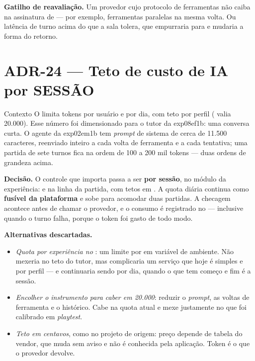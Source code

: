 \textbf{Gatilho de reavaliação.} Um provedor cujo protocolo de ferramentas não
caiba na assinatura de  --- por exemplo, ferramentas paralelas na
mesma volta. Ou latência de turno acima do que a sala tolera, que empurraria para
 e mudaria a forma do retorno.

\section{ADR-24 --- Teto de custo de IA por SESSÃO}
\label{adr:teto-sessao}

\begin{especificacao}{Contexto}
O  limita tokens por usuário e por dia, com teto por perfil
( valia 20.000). Esse número foi
dimensionado para o tutor da exp08ef1b: uma conversa curta. O agente da exp02em1b tem
\emph{prompt} de sistema de cerca de 11.500 caracteres, reenviado inteiro a cada
volta de ferramenta e a cada tentativa; uma partida de sete turnos fica na ordem
de 100 a 200 mil tokens --- duas ordens de grandeza acima.
\end{especificacao}

\textbf{Decisão.} O controle que importa passa a ser \textbf{por sessão}, no
módulo da experiência:  e  na linha da
partida, com tetos em . A quota diária continua como
\textbf{fusível da plataforma} e sobe para acomodar duas partidas. A checagem
acontece antes de chamar o provedor, e o consumo é registrado no  ---
inclusive quando o turno falha, porque o token foi gasto de todo modo.

\textbf{Alternativas descartadas.}
\begin{itemize}
  \item \emph{Quota por experiência no }: um limite por
     em variável de ambiente. Não mexeria no teto do tutor, mas
    complicaria um serviço que hoje é simples e por perfil --- e continuaria
    sendo por dia, quando o que tem começo e fim é a sessão.
  \item \emph{Encolher o instrumento para caber em 20.000}: reduzir o
    \emph{prompt}, as voltas de ferramenta e o histórico. Cabe na quota atual e
    mexe justamente no que foi calibrado em \emph{playtest}.
  \item \emph{Teto em centavos}, como no projeto de origem: preço depende de
    tabela do vendor, que muda sem aviso e não é conhecida pela aplicação. Token
    é o que o provedor devolve.
\end{itemize}


